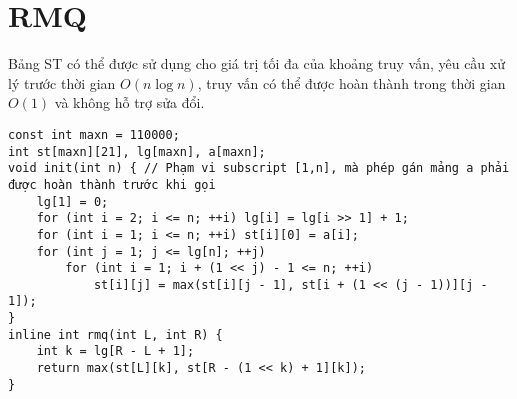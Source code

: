 \section{RMQ}
\par \noindent Bảng ST có thể được sử dụng cho giá trị tối đa của khoảng truy vấn, yêu cầu xử lý trước thời gian $O(n\log n)$, truy vấn có thể được hoàn thành trong thời gian $O(1)$ và không hỗ trợ sửa đổi.

\begin{verbatim}
const int maxn = 110000;
int st[maxn][21], lg[maxn], a[maxn];
void init(int n) { // Phạm vi subscript [1,n], mà phép gán mảng a phải được hoàn thành trước khi gọi
    lg[1] = 0;
    for (int i = 2; i <= n; ++i) lg[i] = lg[i >> 1] + 1;
    for (int i = 1; i <= n; ++i) st[i][0] = a[i];
    for (int j = 1; j <= lg[n]; ++j)
        for (int i = 1; i + (1 << j) - 1 <= n; ++i)
            st[i][j] = max(st[i][j - 1], st[i + (1 << (j - 1))][j - 1]);
}
inline int rmq(int L, int R) {
    int k = lg[R - L + 1];
    return max(st[L][k], st[R - (1 << k) + 1][k]);
}
\end{verbatim}